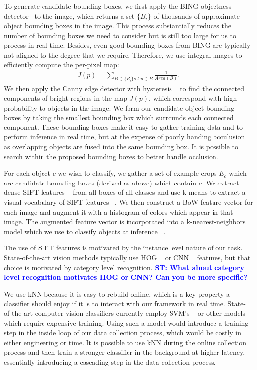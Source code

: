 \documentclass[conference]{IEEEtran}
\newcommand{\stnote}[1]{\textcolor{blue}{\textbf{ST: #1}}}
\begin{document}
To generate candidate bounding boxes, we first apply the BING
objectness detector~\citep{cheng14} to the image, which returns a set
$\{B_i\}$ of thousands of approximate object bounding boxes in the
image. This process substantially reduces the number of bounding boxes
we need to consider but is still too large for us to process in real
time. Besides, even good bounding boxes from BING are typically not
aligned to the degree that we require. Therefore, we use integral
images to efficiently compute the per-pixel map:
\begin{align}
J(p) = \sum_{B \in \{B_i\} s.t. p \in B} \frac{1}{Area(B)}.
\end{align}
We then apply the Canny edge detector with hysteresis ~\citep{} to find the connected components of bright
regions in the map $J(p)$, which correspond with high probability to objects in the image. We form
our candidate object bounding boxes by taking the smallest bounding box which surrounds each connected component.
These bounding boxes make it easy to gather training data and to perform inference in real time, but at
the expense of poorly handing occulusion as overlapping objects are fused into the same bounding box.
It is possible to search within the proposed bounding boxes to better handle occlusion.

For each object $c$ we wish to classify, we gather a set of example crops $E_c$ which are candidate
bounding boxes (derived as above) which contain $c$. We extract dense SIFT features ~\citep{} from all boxes of
all classes and use k-means to extract a visual vocabulary of SIFT features ~\citep{}. We then construct a
BoW feature vector for each image and augment it with a histogram of colors which appear in that image.
The augmented feature vector is incorporated into a k-nearest-neighbors model which we use to classify
objects at inference ~\citep{}.

The use of SIFT features is motivated by the instance level nature of our task. State-of-the-art vision
methods typically use HOG ~\citep{} or CNN ~\citep{} features, but that choice is motivated by category
level recognition. \stnote{What about category level recognition motivates HOG or CNN?  Can you be more specific?}

We use kNN because it is easy to rebuild online, which is a key property a classifier should enjoy
if it is to interact with our framework in real time. State-of-the-art computer vision classifiers
currently employ SVM's ~\citep{} or other models which require expensive training. Using such a model would
introduce a training step in the inside loop of our data collection process, which would be costly
in either engineering or time.  It is possible to use kNN during the online collection process and then
train a stronger classifier in the background at higher latency, essentially introducing a cascading step
in the data collection process.
\end{document}
